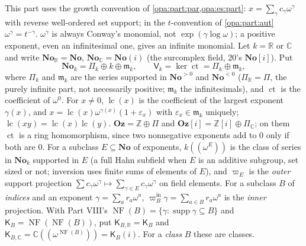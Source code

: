 \documentclass[11pt,oneside]{article}
\numberwithin{equation}{section}
\theoremstyle{definition}
\theoremstyle{remark}
\newcommand{\No}{\mathbf{No}}
\newcommand{\Oz}{\mathbf{Oz}}
\newcommand{\Og}{\mathbf{Oz}[i]}
\newcommand{\SC}{\mathbf{No}(i)}
\newcommand{\R}{\mathbb R}
\newcommand{\C}{\mathbb C}
\newcommand{\Z}{\mathbb Z}
\newcommand{\mm}{\mathfrak m}
\newcommand{\supp}{\operatorname{supp}}
\newcommand{\lc}{\operatorname{lc}}
\newcommand{\ct}{\operatorname{ct}}
\newcommand{\NF}{\operatorname{NF}}
\begin{document}
This part uses the growth convention of \cref{opa:part:par,opa:es:part}: $x=\sum_\gamma c_\gamma\omega^\gamma$ with reverse well-ordered
set support; in the $t$-convention of \cref{opa:part:aut} $\omega^\gamma=t^{-\gamma}$. $\omega^\gamma$ is always Conway's monomial, not
$\exp(\gamma\log\omega)$; a positive exponent, even an infinitesimal one, gives an infinite monomial. Let $k=\R$ or $\C$ and write
$\No_\R=\No$, $\No_\C=\SC$ (the surcomplex field, 20's $\No[i]$). Put
\begin{equation}\label{opa:us:eq:decomposition}
 \No_k=\Pi_k\oplus k\oplus\mm_k,\qquad \mathsf V_k=\ker\ct=\Pi_k\oplus\mm_k,
\end{equation}
where $\Pi_k$ and $\mm_k$ are the series supported in $\No^{>0}$ and $\No^{<0}$ ($\Pi_\R=\Pi$, the purely infinite part, not necessarily
positive; $\mm_k$ the infinitesimals), and $\ct$ is the coefficient of $\omega^0$. For $x\ne0$, $\lc(x)$ is the coefficient of the largest
exponent $\gamma(x)$, and $x=\lc(x)\omega^{\gamma(x)}(1+\varepsilon_x)$ with $\varepsilon_x\in\mm_k$ uniquely; $\lc(xy)=\lc(x)\lc(y)$.
$\Oz=\Z\oplus\Pi$ and $\Og=\Z[i]\oplus\Pi_\C$; on them $\ct$ is a ring homomorphism, since two nonnegative exponents add to $0$ only if
both are $0$. For a subclass $E\subseteq\No$ of exponents, $k((\omega^E))$ is the class of series in $\No_k$ supported in $E$ (a full
Hahn subfield when $E$ is an additive subgroup, set sized or not; inversion uses finite sums of elements of $E$), and $\varpi_E$ is
the \emph{outer} support projection $\sum c_\gamma\omega^\gamma\mapsto\sum_{\gamma\in E}c_\gamma\omega^\gamma$ on field elements. For a
subclass $B$ of \emph{indices} and an exponent $\gamma=\sum_ar_a\omega^a$, $\varpi^{\mathrm{in}}_B\gamma=\sum_{a\in B}r_a\omega^a$ is the
\emph{inner} projection. With Part VIII's $\NF(B)=\{\gamma:\supp\gamma\subseteq B\}$ and $\mathsf K_B=\NF(\NF(B))$, put
$\mathsf K_{B,\R}=\mathsf K_B$ and $\mathsf K_{B,\C}=\C((\omega^{\NF(B)}))=\mathsf K_B(i)$. For a \emph{class} $B$ these are classes.
\end{document}
